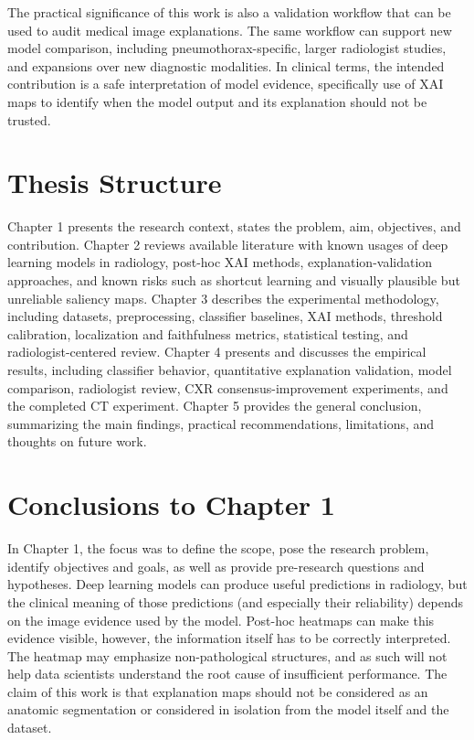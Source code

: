 The practical significance of this work is also a validation workflow that
can be used to audit medical image explanations. The same workflow can support
new model comparison, including pneumothorax-specific, larger
radiologist studies, and expansions over new diagnostic modalities. 
In clinical terms, the intended contribution is a safe
interpretation of model evidence, specifically use of XAI maps 
to identify when the model output and its explanation should not be trusted.

\hypertarget{thesis-structure}{%
	\section{Thesis Structure}\label{thesis-structure}}

Chapter 1 presents the research context, states the problem, aim,
objectives, and contribution. Chapter 2 reviews available literature
with known usages of deep learning models in radiology, post-hoc XAI methods, explanation-validation approaches, and 
known risks such as shortcut learning and visually plausible but
unreliable saliency maps. Chapter 3 describes the experimental
methodology, including datasets, preprocessing, classifier baselines,
XAI methods, threshold calibration, localization and faithfulness
metrics, statistical testing, and radiologist-centered review. Chapter 4
presents and discusses the empirical results, including classifier
behavior, quantitative explanation validation, model comparison,
radiologist review, CXR consensus-improvement experiments, and the
completed CT experiment. Chapter 5 provides the general conclusion, summarizing 
the main findings, practical recommendations, limitations, and thoughts on future work.

\hypertarget{conclusions-to-chapter-1}{%
	\section*{Conclusions to Chapter 1}\label{conclusions-to-chapter-1}}

In Chapter 1, the focus was to define the scope, pose the research problem,
identify objectives and goals, as well as provide pre-research questions
and hypotheses. Deep learning models can produce useful predictions in
radiology, but the clinical meaning of those predictions (and especially 
their reliability) depends on the image evidence used by the model. 
Post-hoc heatmaps can make this evidence visible, 
however, the information itself has to be correctly interpreted. The heatmap
may emphasize non-pathological structures, and as such will not
help data scientists understand the root cause of insufficient performance.
The claim of this work is that explanation maps should not be considered 
as an anatomic segmentation or considered in isolation from the model itself 
and the dataset. 

